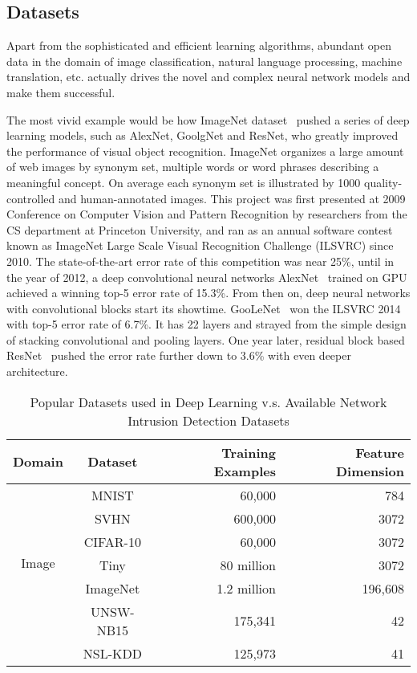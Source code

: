 \subsection{Datasets}
Apart from the sophisticated and efficient learning algorithms,
abundant open data in the domain of image classification, natural language processing, machine translation, etc.
actually drives the novel and complex neural network models and make them successful.

The most vivid example would be how ImageNet dataset~\cite{ImageNet} pushed a series of deep learning models,
such as AlexNet, GoolgNet and ResNet, who greatly improved the performance of visual object recognition.
ImageNet organizes a large amount of web images by synonym set, multiple words or word phrases
describing a meaningful concept.
On average each synonym set is illustrated by 1000 quality-controlled and human-annotated images.
This project was first presented at 2009 Conference on Computer Vision and Pattern Recognition by researchers
from the CS department at Princeton University, and ran as an annual software contest known as
ImageNet Large Scale Visual Recognition Challenge (ILSVRC) since 2010.
The state-of-the-art error rate of this competition was near 25\%,
until in the year of 2012, a deep convolutional neural networks AlexNet~\cite{AlexNet} trained on GPU achieved a winning top-5 error rate of 15.3\%.
From then on, deep neural networks with convolutional blocks start its showtime.
GooLeNet~\cite{GoogLeNet} won the ILSVRC 2014 with top-5 error rate of 6.7\%.
It has 22 layers and strayed from the simple design of stacking convolutional and pooling layers.
One year later, residual block based ResNet~\cite{ResNet} pushed the error rate further down to 3.6\% with even deeper architecture.

\begin{table}[]
\centering
\caption{Popular Datasets used in Deep Learning v.s. Available Network Intrusion Detection Datasets}
\label{Tab:Datasets}
\begin{tabular}{c|c|r|r}
\multicolumn{1}{c|}{Domain}                          & Dataset       & Training Examples & Feature Dimension \\
\hline
\hline
\multirow{6}{*}{Image}                               & MNIST         & 60,000        & 784     \\
                                                     & SVHN          & 600,000       & 3072    \\
                                                     & CIFAR-10      & 60,000        & 3072    \\
                                                     & Tiny          & 80 million    & 3072    \\
                                                     & ImageNet      & 1.2 million   & 196,608 \\
\hline
\multicolumn{1}{c|}{\multirow{2}{*}{IDS}}            & UNSW-NB15     & 175,341       & 42      \\
\multicolumn{1}{l|}{}                                & NSL-KDD       & 125,973       & 41      
\end{tabular}
\end{table}

